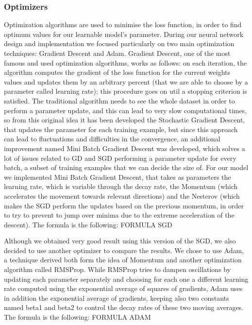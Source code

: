 \documentclass{article}
\begin{document}

\subsubsection{Optimizers}
Optimization algorithms are used to minimise the loss function, in order to find optimum values for our learnable model’s parameter. During our neural network design and implementation we focused particularly on two main optimization techniques: Gradient Descent and Adam. 
Gradient Descent, one of the most famous and used optimization algorithms, works as follows: on each iteration, the algorithm computes the gradient of the loss function for the current weights values and updates them by an arbitrary percent (that we are able to choose by a parameter called learning rate); this procedure goes on util a stopping criterion is satisfied. 
The traditional algorithm needs to see the whole dataset in order to perform a parameter update, and this can lead to very slow computational times, so from this original idea it has been developed the Stochastic Gradient Descent, that updates the parameter for each training example, but since this approach can lead to fluctuations and difficulties in the convergence, an additional improvement named Mini Batch Gradient Descent was developed, which solves a lot of issues related to GD and SGD performing a parameter update for every batch, a subset of training examples that we can decide the size of. 
For our model we implemented Mini Batch Gradient Descent, that takes as parameters the learning rate, which is variable through the decay rate, the Momentum (which accelerates the movement towards relevant directions) and the Nesterov (which makes the SGD perform the updates based on the previous momentum, in order to try to prevent to jump over minima due to the extreme acceleration of the descent).  
The formula is the following:
FORMULA SGD

Although we obtained very good result using this version of the SGD, we also decided to use another optimizer to compare the results. We chose to use Adam, a technique derived both form the idea of Momentum and another optimization algorithm called RMSProp. 
While RMSProp tries to dampen oscillations by updating each parameter separately and choosing for each one a different learning rate computed using the exponential average of squares of gradients, Adam uses in addition the exponential average of gradients, keeping also two constants named beta1 and beta2 to control the decay rates of these two moving averages. 
The formula is the following:
FORMULA ADAM
\end{document}
